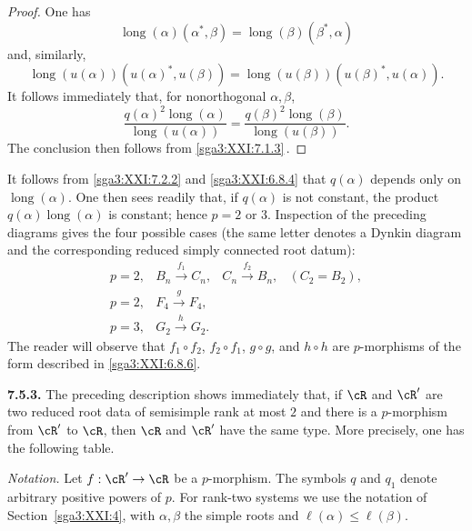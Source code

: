 \begin{proof}
One has
\[
 \operatorname{long}(\alpha)(\alpha^\ast,\beta)
 =
 \operatorname{long}(\beta)(\beta^\ast,\alpha)
\]
and, similarly,
\[
 \operatorname{long}(u(\alpha))
   (u(\alpha)^\ast,u(\beta))
 =
 \operatorname{long}(u(\beta))
   (u(\beta)^\ast,u(\alpha)).
\]
It follows immediately that, for nonorthogonal \(\alpha,\beta\),
\[
 \frac{q(\alpha)^2\operatorname{long}(\alpha)}
      {\operatorname{long}(u(\alpha))}
 =
 \frac{q(\beta)^2\operatorname{long}(\beta)}
      {\operatorname{long}(u(\beta))}.
\]
The conclusion then follows from \ref{sga3:XXI:7.1.3}\,.
\end{proof}

\begin{remark}\label{sga3:XXI:7.5.2}
It follows from \ref{sga3:XXI:7.2.2} and
\ref{sga3:XXI:6.8.4} that \(q(\alpha)\) depends only on
\(\operatorname{long}(\alpha)\).  One then sees readily that, if
\(q(\alpha)\) is not constant, the product
\(q(\alpha)\operatorname{long}(\alpha)\) is constant; hence
\(p=2\) or \(3\).  Inspection of the preceding diagrams gives the
four possible cases (the same letter denotes a Dynkin diagram and
the corresponding reduced simply connected root datum):
\[
\begin{array}{llll}
p=2, & B_n\xrightarrow{\,f_1\,}C_n,
     & C_n\xrightarrow{\,f_2\,}B_n,
     & (C_2=B_2),\\
p=2, & F_4\xrightarrow{\,g\,}F_4,\\
p=3, & G_2\xrightarrow{\,h\,}G_2.
\end{array}
\]
The reader will observe that
\(f_1\circ f_2\), \(f_2\circ f_1\), \(g\circ g\), and
\(h\circ h\) are \(p\)-morphisms of the form described in
\ref{sga3:XXI:6.8.6}.
\end{remark}

\medskip
\noindent\textbf{7.5.3.}\label{sga3:XXI:7.5.3}
The preceding description shows immediately that, if \(\cR\) and
\(\cR'\) are two reduced root data of semisimple rank at most \(2\)
and there is a \(p\)-morphism from \(\cR'\) to \(\cR\), then
\(\cR\) and \(\cR'\) have the same type.  More precisely, one has
the following table.

\medskip
\noindent\emph{Notation.}
Let \(f:\cR'\to\cR\) be a \(p\)-morphism.  The symbols \(q\) and
\(q_1\) denote arbitrary positive powers of \(p\).  For rank-two
systems we use the notation of Section~\ref{sga3:XXI:4}, with
\(\alpha,\beta\) the simple roots and
\(\ell(\alpha)\leq\ell(\beta)\).


